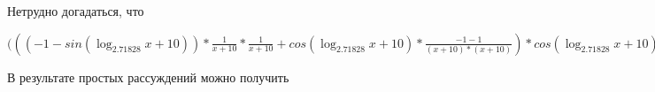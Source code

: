 \documentclass[12pt,a4paper,fleqn]{article}
\theoremstyle{definition}
\begin{document}
Нетрудно догадаться, что

$((( -1  - sin(\log_{ 2.71828 }{ x  +  10 })) * \frac{ 1 }{ x  +  10 }
 * \frac{ 1 }{ x  +  10 }
 + cos(\log_{ 2.71828 }{ x  +  10 }) * \frac{ -1  -  1 }{( x  +  10 ) * ( x  +  10 )}
) * cos(\log_{ 2.71828 }{ x  +  10 }) * \frac{ 1 }{ x  +  10 }
 * { 3 }^{sin(\log_{ 2.71828 }{ x  +  10 })} + cos(\log_{ 2.71828 }{ x  +  10 }) * \frac{ 1 }{ x  +  10 }
 * ((( -1  - sin(\log_{ 2.71828 }{ x  +  10 })) * \frac{ 1 }{ x  +  10 }
 * \frac{ 1 }{ x  +  10 }
 + cos(\log_{ 2.71828 }{ x  +  10 }) * \frac{ -1  -  1 }{( x  +  10 ) * ( x  +  10 )}
) * { 3 }^{sin(\log_{ 2.71828 }{ x  +  10 })} + cos(\log_{ 2.71828 }{ x  +  10 }) * \frac{ 1 }{ x  +  10 }
 * cos(\log_{ 2.71828 }{ x  +  10 }) * \frac{ 1 }{ x  +  10 }
 * { 3 }^{sin(\log_{ 2.71828 }{ x  +  10 })}) = (( -1  - sin(\log_{ 2.71828 }{ x  +  10 })) * \frac{ 1 }{ x  +  10 }
 * \frac{ 1 }{ x  +  10 }
 + cos(\log_{ 2.71828 }{ x  +  10 }) * \frac{ -1  -  1 }{( x  +  10 ) * ( x  +  10 )}
) * cos(\log_{ 2.71828 }{ x  +  10 }) * \frac{ 1 }{ x  +  10 }
 * { 3 }^{sin(\log_{ 2.71828 }{ x  +  10 })} + cos(\log_{ 2.71828 }{ x  +  10 }) * \frac{ 1 }{ x  +  10 }
 * ((( -1  - sin(\log_{ 2.71828 }{ x  +  10 })) * \frac{ 1 }{ x  +  10 }
 * \frac{ 1 }{ x  +  10 }
 + cos(\log_{ 2.71828 }{ x  +  10 }) * \frac{ -1  -  1 }{( x  +  10 ) * ( x  +  10 )}
) * { 3 }^{sin(\log_{ 2.71828 }{ x  +  10 })} + cos(\log_{ 2.71828 }{ x  +  10 }) * \frac{ 1 }{ x  +  10 }
 * cos(\log_{ 2.71828 }{ x  +  10 }) * \frac{ 1 }{ x  +  10 }
 * { 3 }^{sin(\log_{ 2.71828 }{ x  +  10 })})$

В результате простых рассуждений можно получить
\end{document}
